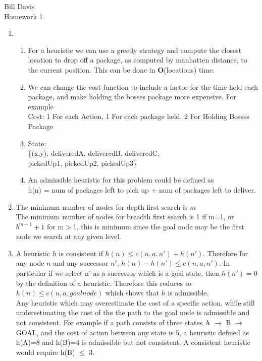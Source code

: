 \documentclass[11pt,fleqn]{article}
\begin{document}
\newcommand{\mbf}[1]{\mbox{{\bfseries #1}}}
\newcommand{\N}{\mbf{N}}
\renewcommand{\O}{\mbf{O}}

\noindent Bill Davis \\
Homework 1

\begin{enumerate}
\item %

\begin{enumerate}
\item  %
For a heuristic we can use a greedy strategy and compute the closest location to drop off a package, as computed by manhatten distance, to the current position. This can be done in \O(locations) time. 
\item  %
We can change the cost function to include a factor for the time held each package, and make holding the bosses package more expensive. For example \\ 
Cost: 1 For each Action, 1 For each package held, 2 For Holding Bosses Package
\item  %
State:\\
\{(x,y), deliveredA, deliveredB, deliveredC,\\
 pickedUp1, pickedUp2, pickedUp3\}

\item  %
An admissible heuristic for this problem could be defined as \\
h(n) = num of packages left to pick up + num of packages left to deliver. 
\end{enumerate}


\item %
The minimum number of nodes for depth first search is $m$ \\
The minimum number of nodes for breadth first search is 1 if m=1, or $b^{m-1}+1$ for m$>$1, this is minimum since the goal node may be the first node we search at any given level. 


\item %
A heuristic $h$ is consistent if $h(n) \le c(n,a,n') + h(n')$. Therefore for any node $n$ and any successor $n'$, $h(n) - h(n')\le c(n,a,n')$. In particular if we select n' as a successor which is a goal state, then $h(n') = 0$ by the definition of a heuristic. Therefore this reduces to $h(n) \le c(n,a,goal node)$ which shows that $h$ is admissible. \\

Any heuristic which may overestimate the cost of a specific action, while still underestimating the cost of the the path to the goal node is admissible and not consistent. For example if a path consists of three states A $\rightarrow$ B $\rightarrow$ GOAL, and the cost of action between any state is 5, a heuristic defined as h(A)=8 and h(B)=4 is admissible but not consistent. A consistent heuristic would require h(B) $\le$ 3. 


\end{enumerate}
\end{document}
